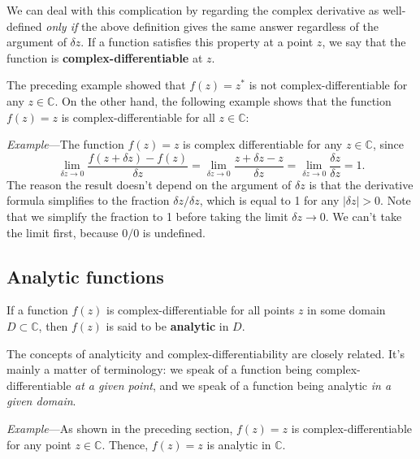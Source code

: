 \documentclass[10pt,a4paper]{article}
\begin{document}
We can deal with this complication by regarding the complex derivative
as well-defined \emph{only if} the above definition gives the same
answer regardless of the argument of $\delta z$. If a function
satisfies this property at a point $z$, we say that the function is
\textbf{complex-differentiable} at $z$.

The preceding example showed that $f(z) = z^*$ is not
complex-differentiable for any $z \in \mathbb{C}$. On the other hand,
the following example shows that the function $f(z) = z$ is
complex-differentiable for all $z \in \mathbb{C}$:

\begin{framed}\noindent
  \textit{Example}---The function $f(z) = z$ is complex differentiable
  for any $z \in \mathbb{C}$, since
\begin{equation}
  \lim_{\delta z \rightarrow0} \frac{f(z+\delta z) - f(z)}{\delta z} = \lim_{\delta z \rightarrow0} \frac{z+\delta z - z}{\delta z} = \lim_{\delta z \rightarrow0} \frac{\delta z}{\delta z} = 1.
\end{equation}
The reason the result doesn't depend on the argument of $\delta z$ is
that the derivative formula simplifies to the fraction $\delta z /
\delta z$, which is equal to 1 for any $|\delta z| > 0$.  Note that we
simplify the fraction to 1 before taking the limit $\delta z
\rightarrow 0$. We can't take the limit first, because $0/0$ is undefined.
\end{framed}

\subsection{Analytic functions}
\label{analytic-functions}

If a function $f(z)$ is complex-differentiable for all points $z$ in
some domain $D\subset \mathbb{C}$, then $f(z)$ is said to be
\textbf{analytic} in $D$.

The concepts of analyticity and complex-differentiability are closely
related. It's mainly a matter of terminology: we speak of a function
being complex-differentiable \emph{at a given point}, and we speak of a
function being analytic \emph{in a given domain}.

\begin{framed}\noindent
  \textit{Example}---As shown in the preceding section, $f(z) = z$ is
  complex-differentiable for any point $z \in \mathbb{C}$. Thence,
  $f(z) = z$ is analytic in $\mathbb{C}$.
\end{framed}
\end{document}
